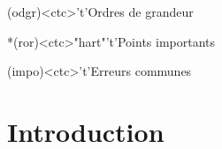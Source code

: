 \documentclass[../../main/main.tex]{subfiles}
\begin{document}
\begin{tcn}[sidebyside, fontupper=\small, fontlower=\small]
	\begin{tcn}(odgr)<ctc>'t'{Ordres de grandeur}
	\end{tcn}
	\begin{tcn}*(ror)<ctc>"hart"'t'{Points importants}
	\end{tcn}
	\begin{tcn}(impo)<ctc>'t'{Erreurs communes}
	\end{tcn}
\end{tcn}

\vspace*{\fill}
\newpage

\section{Introduction}
\end{document}
